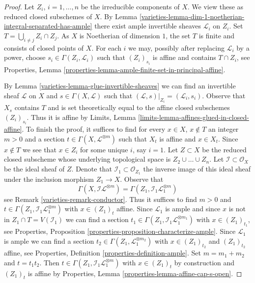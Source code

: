 \begin{proof}

Let $Z_i$, $i = 1, \ldots, n$ be the irreducible components of $X$.
We view these as reduced closed subschemes of $X$.
By Lemma \ref{varieties-lemma-dim-1-noetherian-integral-separated-has-ample}
there exist ample invertible sheaves $\mathcal{L}_i$ on $Z_i$.
Set $T = \bigcup_{i \not = j} Z_i \cap Z_j$. As $X$ is Noetherian
of dimension $1$, the set $T$ is finite and consists of closed
points of $X$. For each $i$ we may, possibly after replacing
$\mathcal{L}_i$ by a power, choose $s_i \in \Gamma(Z_i, \mathcal{L}_i)$
such that $(Z_i)_{s_i}$ is affine and contains $T \cap Z_i$, see
Properties, Lemma \ref{properties-lemma-ample-finite-set-in-principal-affine}.

\medskip\noindent
By Lemma \ref{varieties-lemma-glue-invertible-sheaves} we can find an invertible sheaf
$\mathcal{L}$ on $X$ and $s \in \Gamma(X, \mathcal{L})$
such that $(\mathcal{L}, s)|_{Z_i} = (\mathcal{L}_i, s_i)$.
Observe that $X_s$ contains $T$ and is set theoretically equal
to the affine closed subschemes $(Z_i)_{s_i}$. Thus it is affine by
Limits, Lemma \ref{limits-lemma-affines-glued-in-closed-affine}.
To finish the proof, it suffices to find for every $x \in X$, $x \not \in T$
an integer $m > 0$ and a section $t \in \Gamma(X, \mathcal{L}^{\otimes m})$
such that $X_t$ is affine and $x \in X_t$. Since $x \not \in T$
we see that $x \in Z_i$ for some unique $i$, say $i = 1$.
Let $Z \subset X$ be the reduced closed subscheme whose underlying
topological space is $Z_2 \cup \ldots \cup Z_n$.
Let $\mathcal{I} \subset \mathcal{O}_X$ be the ideal
sheaf of $Z$. Denote that $\mathcal{I}_1 \subset \mathcal{O}_{Z_1}$
the inverse image of this ideal sheaf under the inclusion
morphism $Z_1 \to X$. Observe that
$$
\Gamma(X, \mathcal{I}\mathcal{L}^{\otimes m}) =
\Gamma(Z_1, \mathcal{I}_1 \mathcal{L}_1^{\otimes m})
$$
see Remark \ref{varieties-remark-conductor}. Thus it suffices to find $m > 0$
and $t \in \Gamma(Z_1, \mathcal{I}_1 \mathcal{L}_1^{\otimes m})$
with $x \in (Z_1)_t$ affine. Since $\mathcal{L}_1$ is ample
and since $x$ is not in $Z_1 \cap T = V(\mathcal{I}_1)$
we can find a section
$t_1 \in \Gamma(Z_1, \mathcal{I}_1 \mathcal{L}_1^{\otimes m_1})$
with $x \in (Z_1)_{t_1}$, see Properties, Proposition
\ref{properties-proposition-characterize-ample}.
Since $\mathcal{L}_1$ is ample we can find a section
$t_2 \in \Gamma(Z_1, \mathcal{L}_1^{\otimes m_2})$
with $x \in (Z_1)_{t_2}$ and $(Z_1)_{t_2}$ affine, see
Properties, Definition \ref{properties-definition-ample}.
Set $m = m_1 + m_2$ and $t = t_1 t_2$. Then
$t \in \Gamma(Z_1, \mathcal{I}_1 \mathcal{L}_1^{\otimes m})$
with $x \in (Z_1)_t$ by construction and
$(Z_1)_t$ is affine by Properties, Lemma
\ref{properties-lemma-affine-cap-s-open}.
\end{proof}

